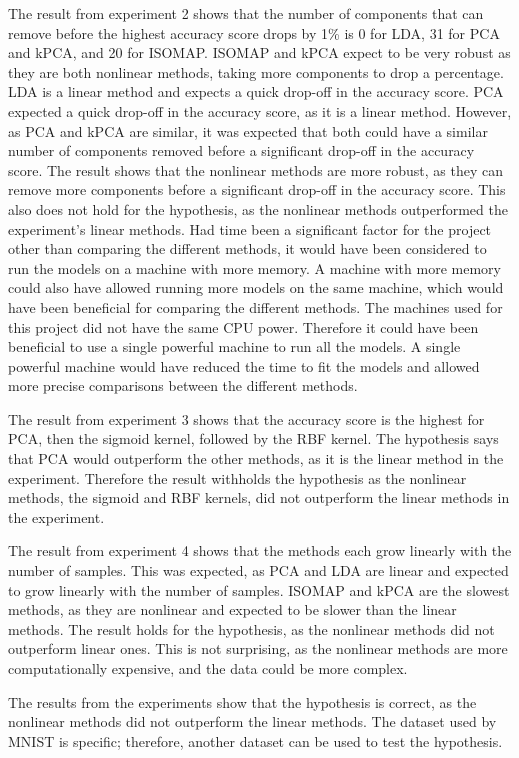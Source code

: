 The result from experiment 2 shows that the number of components that can remove before the highest accuracy score drops by 1\% is 0 for LDA, 31 for PCA and kPCA, and 20 for ISOMAP. ISOMAP and kPCA expect to be very robust as they are both nonlinear methods, taking more components to drop a percentage. LDA is a linear method and expects a quick drop-off in the accuracy score. PCA expected a quick drop-off in the accuracy score, as it is a linear method. However, as PCA and kPCA are similar, it was expected that both could have a similar number of components removed before a significant drop-off in the accuracy score. The result shows that the nonlinear methods are more robust, as they can remove more components before a significant drop-off in the accuracy score. This also does not hold for the hypothesis, as the nonlinear methods outperformed the experiment's linear methods. Had time been a significant factor for the project other than comparing the different methods, it would have been considered to run the models on a machine with more memory. A machine with more memory could also have allowed running more models on the same machine, which would have been beneficial for comparing the different methods. The machines used for this project did not have the same CPU power. Therefore it could have been beneficial to use a single powerful machine to run all the models. A single powerful machine would have reduced the time to fit the models and allowed more precise comparisons between the different methods.

The result from experiment 3 shows that the accuracy score is the highest for PCA, then the sigmoid kernel, followed by the RBF kernel. The hypothesis says that PCA would outperform the other methods, as it is the linear method in the experiment. Therefore the result withholds the hypothesis as the nonlinear methods, the sigmoid and RBF kernels, did not outperform the linear methods in the experiment. 

The result from experiment 4 shows that the methods each grow linearly with the number of samples. This was expected, as PCA and LDA are linear and expected to grow linearly with the number of samples. ISOMAP and kPCA are the slowest methods, as they are nonlinear and expected to be slower than the linear methods. The result holds for the hypothesis, as the nonlinear methods did not outperform linear ones. This is not surprising, as the nonlinear methods are more computationally expensive, and the data could be more complex.

The results from the experiments show that the hypothesis is correct, as the nonlinear methods did not outperform the linear methods. The dataset used by MNIST is specific; therefore, another dataset can be used to test the hypothesis. 




